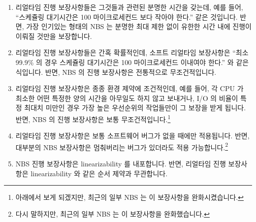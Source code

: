 \begin{enumerate}
\item	리얼타임 진행 보장사항들은 그것들과 관련된 분명한 시간을 갖는데, 예를
	들어, ``스케쥴링 대기시간은 100 마이크로세컨드 보다 작아야 한다.'' 같은
	것입니다.
	반면, 가장 인기있는 형태의 NBS 는 분명한 최대 제한 없이 유한한 시간
	내에 진행이 이뤄질 것만을 보장합니다.
\item	리얼타임 진행 보장사항들은 간혹 확률적인데, 소프트 리얼타임 보장사항은
	``최소 99.9\% 의 경우 스케쥴링 대기시간은 100 마이크로세컨드 이내여야
	한다.'' 와 같은 식입니다.
	반면, NBS 의 진행 보장사항은 전통적으로 무조건적입니다.
\item	리얼타임 진행 보장사항은 종종 환경 제약에 조건적인데, 예를 들어, 각 CPU
	가 최소한 어떤 특정한 양의 시간을 아무일도 하지 않고 보내거나, I/O 의
	비율이 특정 최대치 미만인 경우 가장 높은 우선순위의 작업들만이 그
	보장을 받게 됩니다.
	반면, NBS 의 진행 보장사항은 보통 무조건적입니다.\footnote{
		아래에서 보게 되겠지만, 최근의 일부 NBS 는 이 보장사항을
		완화시켰습니다.}
\item	리얼타임 진행 보장사항은 보통 소프트웨어 버그가 없을 때에만 적용됩니다.
	반면, 대부분의 NBS 보장사항은 멈춰버리는 버그가 있더라도 적용
	가능합니다.\footnote{
		다시 말하지만, 최근의 일부 NBS 는 이 보장사항을 완화했습니다.}
\item	NBS 진행 보장사항은 linearizability 를 내포합니다.
	반면, 리얼타임 진행 보장사항은 linearizability 와 같은 순서 제약과
	무관합니다.
\end{enumerate}
\iffalse

\item	Real-time forward-progress guarantees usually have some
	definite time associated with them, for example,
	``scheduling latency must be less than 100 microseconds.''.
	In contrast, the most popular forms of NBS only guarantees
	that progress will be made in finite time, with no definite
	bound.
\item	Real-time forward-progress guarantees are sometimes
	probabilistic, as in the soft-real-time guarantee that
	``at least 99.9\% of the time, scheduling latency must
	be less than 100 microseconds.''.
	In contrast, NBS's forward-progress
	guarantees have traditionally been unconditional.
\item	Real-time forward-progress guarantees are often conditioned on
	environmental constraints, for example, only being honored
	for the highest-priority tasks, when each CPU spends at least
	a certain fraction of its time idle, or when I/O rates are
	below some specified maximum.
	In contrast, NBS's forward-progress
	guarantees are usually unconditional.\footnote{
		As we will see below, some recent NBS work relaxes
		this guarantee.}
\item	Real-time forward-progress guarantees usually apply only
	in the absence of software bugs.
	In contrast, most NBS guarantees apply even in the face of
	fail-stop bugs.\footnote{
		Again, some recent NBS work relaxes this guarantee.}
\item	NBS forward-progress guarantee classes imply linearizability.
	In contrast, real-time forward progress guarantees are often
	independent of ordering constraints such as linearizability.
\end{enumerate}
\fi

